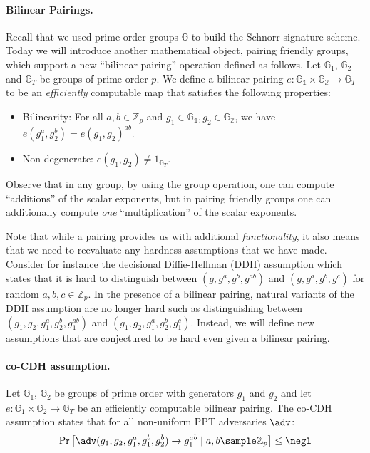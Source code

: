 \paragraph{Bilinear Pairings.} Recall that we used prime order groups $\mathbb{G}$ to build the Schnorr signature scheme. Today we will introduce another mathematical object, pairing friendly groups, which support a new ``bilinear pairing'' operation defined as follows. Let $\mathbb{G}_1$, $\mathbb{G}_2$ and $\mathbb{G}_T$ be groups of prime order $p$. We define a bilinear pairing $e: \mathbb{G_1} \times \mathbb{G_2} \rightarrow \mathbb{G}_T$ to be an \emph{efficiently} computable map that satisfies the following properties:
\begin{itemize}
    \item Bilinearity: For all $a, b \in \mathbb{Z}_p$ and $g_1 \in \mathbb{G_1}, g_2 \in \mathbb{G_2}$, we have $e(g_1^a, g_2^b) = e(g_1, g_2)^{ab}$.
    \item Non-degenerate: $e(g_1, g_2) \neq 1_{\mathbb{G}_T}$.
\end{itemize}
Observe that in any group, by using the group operation, one can compute ``additions'' of the scalar exponents, but in pairing friendly groups one can additionally compute \emph{one} ``multiplication'' of the scalar exponents.

Note that while a pairing provides us with additional \emph{functionality}, it also means that we need to reevaluate any hardness assumptions that we have made. Consider for instance the decisional Diffie-Hellman (DDH) assumption which states that it is hard to distinguish between $(g, g^a, g^b, g^{ab})$ and $(g, g^a, g^b, g^c)$ for random $a, b, c \in \mathbb{Z}_p$. In the presence of a bilinear pairing, natural variants of the DDH assumption are no longer hard such as distinguishing between $(g_1, g_2, g_1^a, g_2^b, g_1^{ab})$ and $(g_1, g_2, g_1^a, g_2^b, g_1^{c})$. Instead, we will define new assumptions that are conjectured to be hard even given a bilinear pairing.

\paragraph{co-CDH assumption.} Let $\mathbb{G}_1$, $\mathbb{G}_2$ be groups of prime order with generators $g_1$ and $g_2$ and let $e: \mathbb{G}_1 \times \mathbb{G}_2 \rightarrow \mathbb{G}_T$ be an efficiently computable bilinear pairing. The co-CDH assumption states that for all non-uniform PPT adversaries $\adv$:
\begin{align*}
    \Pr\left[ \adv(g_1, g_2, g_1^a, g_1^b, g_2^b) \to g_1^{ab} \mid a,b \sample \mathbb{Z}_p \right] \leq \negl
\end{align*}

